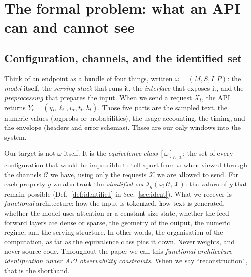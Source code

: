 \section{The formal problem: what an API can and cannot see}
\label{sec:setup}
\subsection{Configuration, channels, and the identified set}
Think of an endpoint as a bundle of four things, written $\omega=(M,S,I,P)$: the
\emph{model} itself, the \emph{serving stack} that runs it, the \emph{interface} that
exposes it, and the \emph{preprocessing} that prepares the input.  When we send a
request $X_t$, the API returns $Y_t=(y_t,\ell_t,u_t,t_t,h_t)$.  Those five parts are
the sampled text, the numeric values (logprobs or probabilities), the usage accounting,
the timing, and the envelope (headers and error schemas).  These are our only windows
into the system.

Our target is not $\omega$ itself.  It is the \emph{equivalence class}
$[\omega]_{\mathcal C,\mathcal X}$: the set of every configuration that would be
impossible to tell apart from $\omega$ when viewed through the channels $\mathcal C$ we
have, using only the requests $\mathcal X$ we are allowed to send.  For each property
$g$ we also track the \emph{identified set} $\mathcal I_g(\omega;\mathcal C,\mathcal
X)$: the values of $g$ that remain possible (Def.~\ref{def:identified} in
Sec.~\ref{sec:ident}).  What we recover is \emph{functional} architecture: how the
input is tokenized, how text is generated, whether the model uses attention or a
constant-size state, whether the feed-forward layers are dense or sparse, the geometry of
the output, the numeric regime, and the serving structure.  In other words, the
organisation of the computation, as far as the equivalence class pins it down.  Never
weights, and never source code.  Throughout the paper we call this \emph{functional
architecture identification under API observability constraints}.  When we say
``reconstruction'', that is the shorthand.

